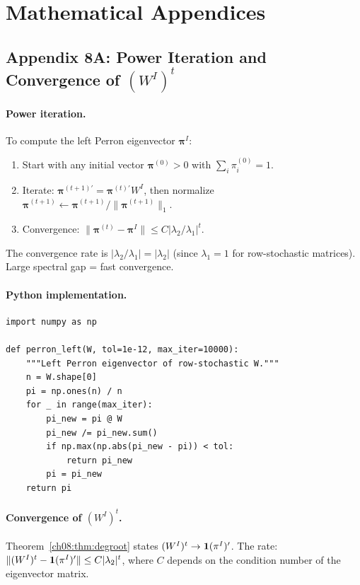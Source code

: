 \documentclass[../structural_economics_book.tex]{subfiles}
\begin{document}
\section*{Mathematical Appendices}


\subsection*{Appendix 8A: Power Iteration and Convergence of $(W^I)^t$}
\label{ch08:app:power_iteration}

\paragraph{Power iteration.} To compute the left Perron eigenvector $\boldsymbol{\pi}^I$:
\begin{enumerate}
\item Start with any initial vector $\boldsymbol{\pi}^{(0)} > 0$ with $\sum_i \pi^{(0)}_i = 1$.
\item Iterate: $\boldsymbol{\pi}^{(t+1)\prime} = \boldsymbol{\pi}^{(t)\prime} W^I$, then normalize $\boldsymbol{\pi}^{(t+1)} \leftarrow \boldsymbol{\pi}^{(t+1)} / \|\boldsymbol{\pi}^{(t+1)}\|_1$.
\item Convergence: $\|\boldsymbol{\pi}^{(t)} - \boldsymbol{\pi}^I\| \leq C |\lambda_2/\lambda_1|^t$.
\end{enumerate}

The convergence rate is $|\lambda_2/\lambda_1| = |\lambda_2|$ (since $\lambda_1 = 1$ for row-stochastic matrices). Large spectral gap = fast convergence.

\paragraph{Python implementation.}
\begin{verbatim}
import numpy as np

def perron_left(W, tol=1e-12, max_iter=10000):
    """Left Perron eigenvector of row-stochastic W."""
    n = W.shape[0]
    pi = np.ones(n) / n
    for _ in range(max_iter):
        pi_new = pi @ W
        pi_new /= pi_new.sum()
        if np.max(np.abs(pi_new - pi)) < tol:
            return pi_new
        pi = pi_new
    return pi
\end{verbatim}

\paragraph{Convergence of $(W^I)^t$.} Theorem~\ref{ch08:thm:degroot} states $(W^I)^t \to \mathbf{1}(\pi^I)'$. The rate: $\|(W^I)^t - \mathbf{1}(\pi^I)'\| \leq C |\lambda_2|^t$, where $C$ depends on the condition number of the eigenvector matrix.
\end{document}
